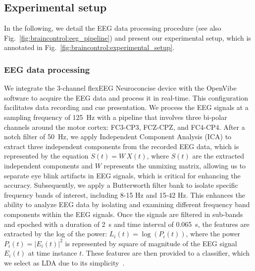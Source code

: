 \documentclass[letterpaper, 10pt, conference]{ieeeconf}      %
\begin{document}
\subsection{Experimental setup}
In the following, we detail the \gls{EEG} data processing procedure (see also Fig.~\ref{fig:braincontrol:eeg_pipeline}) and present our experimental setup, which is annotated in Fig.~\ref{fig:braincontrol:experimental_setup}.

\subsubsection{EEG data processing}\label{ssub:braincontrol:eeg_pipeline}
We integrate the 3-channel flexEEG Neuroconcise device with the OpenVibe software
to acquire the EEG data and process it in real-time.
This configuration facilitates data recording and cue presentation. We process the \gls{EEG} signals at a sampling frequency of \SI{125}{Hz} with a pipeline that involves three bi-polar channels around the motor cortex: FC3-CP3, FCZ-CPZ, and FC4-CP4.
After a notch filter of \SI{50}{Hz}, we apply Independent Component Analysis (ICA) to extract three independent components from the recorded \gls{EEG} data, which is represented by the equation $S(t) = W \, X(t)$, where $S(t)$ are the extracted independent components and $W$ represents the unmixing matrix, allowing us to separate eye blink artifacts in \gls{EEG} signals, which is critical for enhancing the accuracy. 
Subsequently, we apply a Butterworth filter bank to isolate specific frequency bands of interest, including 8-15 \si{Hz} and 15-42 \si{Hz}. 
This enhances the ability to analyze \gls{EEG} data by isolating and examining different frequency band components within the \gls{EEG} signals. Once the signals are filtered in sub-bands and epoched with a duration of \SI{2}{s} and time interval of \SI{0.065}{s}, the features are extracted by the log of the power: $L_i(t) = \log\left(P_i(t)\right)$, where the power $P_i(t) = |E_i(t)|^2$ is represented by square of magnitude of the \gls{EEG} signal $E_i(t)$ at time instance $t$.
These features are then provided to a classifier, which we select as \gls{LDA} due to its simplicity~\cite{lotte2014tutorial}.
\end{document}
